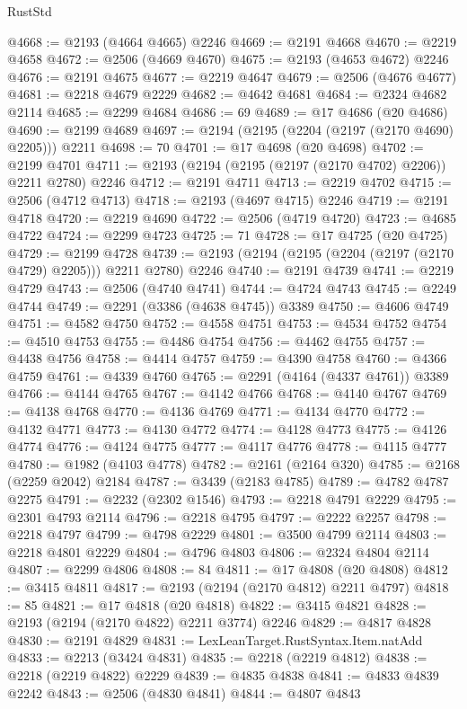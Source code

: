 \begin{lexlean}{RustStd}
\begin{coremodule}
@4668 := @2193 (@4664 @4665) @2246
@4669 := @2191 @4668
@4670 := @2219 @4658
@4672 := @2506 (@4669 @4670)
@4675 := @2193 (@4653 @4672) @2246
@4676 := @2191 @4675
@4677 := @2219 @4647
@4679 := @2506 (@4676 @4677)
@4681 := @2218 @4679 @2229
@4682 := @4642 @4681
@4684 := @2324 @4682 @2114
@4685 := @2299 @4684
@4686 := 69
@4689 := @17 @4686 (@20 @4686)
@4690 := @2199 @4689
@4697 := @2194 (@2195 (@2204 (@2197 (@2170 @4690) @2205))) @2211
@4698 := 70
@4701 := @17 @4698 (@20 @4698)
@4702 := @2199 @4701
@4711 := @2193 (@2194 (@2195 (@2197 (@2170 @4702) @2206)) @2211 @2780) @2246
@4712 := @2191 @4711
@4713 := @2219 @4702
@4715 := @2506 (@4712 @4713)
@4718 := @2193 (@4697 @4715) @2246
@4719 := @2191 @4718
@4720 := @2219 @4690
@4722 := @2506 (@4719 @4720)
@4723 := @4685 @4722
@4724 := @2299 @4723
@4725 := 71
@4728 := @17 @4725 (@20 @4725)
@4729 := @2199 @4728
@4739 := @2193 (@2194 (@2195 (@2204 (@2197 (@2170 @4729) @2205))) @2211 @2780) @2246
@4740 := @2191 @4739
@4741 := @2219 @4729
@4743 := @2506 (@4740 @4741)
@4744 := @4724 @4743
@4745 := @2249 @4744
@4749 := @2291 (@3386 (@4638 @4745)) @3389
@4750 := @4606 @4749
@4751 := @4582 @4750
@4752 := @4558 @4751
@4753 := @4534 @4752
@4754 := @4510 @4753
@4755 := @4486 @4754
@4756 := @4462 @4755
@4757 := @4438 @4756
@4758 := @4414 @4757
@4759 := @4390 @4758
@4760 := @4366 @4759
@4761 := @4339 @4760
@4765 := @2291 (@4164 (@4337 @4761)) @3389
@4766 := @4144 @4765
@4767 := @4142 @4766
@4768 := @4140 @4767
@4769 := @4138 @4768
@4770 := @4136 @4769
@4771 := @4134 @4770
@4772 := @4132 @4771
@4773 := @4130 @4772
@4774 := @4128 @4773
@4775 := @4126 @4774
@4776 := @4124 @4775
@4777 := @4117 @4776
@4778 := @4115 @4777
@4780 := @1982 (@4103 @4778)
@4782 := @2161 (@2164 @320)
@4785 := @2168 (@2259 @2042) @2184
@4787 := @3439 (@2183 @4785)
@4789 := @4782 @4787 @2275
@4791 := @2232 (@2302 @1546)
@4793 := @2218 @4791 @2229
@4795 := @2301 @4793 @2114
@4796 := @2218 @4795
@4797 := @2222 @2257
@4798 := @2218 @4797
@4799 := @4798 @2229
@4801 := @3500 @4799 @2114
@4803 := @2218 @4801 @2229
@4804 := @4796 @4803
@4806 := @2324 @4804 @2114
@4807 := @2299 @4806
@4808 := 84
@4811 := @17 @4808 (@20 @4808)
@4812 := @3415 @4811
@4817 := @2193 (@2194 (@2170 @4812) @2211 @4797)
@4818 := 85
@4821 := @17 @4818 (@20 @4818)
@4822 := @3415 @4821
@4828 := @2193 (@2194 (@2170 @4822) @2211 @3774) @2246
@4829 := @4817 @4828
@4830 := @2191 @4829
@4831 := LexLeanTarget.RustSyntax.Item.natAdd
@4833 := @2213 (@3424 @4831)
@4835 := @2218 (@2219 @4812)
@4838 := @2218 (@2219 @4822) @2229
@4839 := @4835 @4838
@4841 := @4833 @4839 @2242
@4843 := @2506 (@4830 @4841)
@4844 := @4807 @4843

\end{coremodule}
\end{lexlean}
